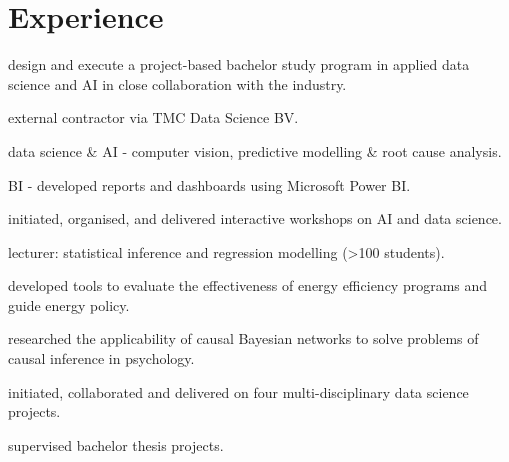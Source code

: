 \begin{minipage}[t]{0.66\textwidth} %

\section{Experience}

\vspace{\topsep}
\begin{tightitemize}
\item design and execute a project-based bachelor study program in applied data science and AI in close collaboration with the industry.
\end{tightitemize}
\sectionspace

\vspace{\topsep}
\begin{tightitemize}
\item external contractor via TMC Data Science BV.
\item data science \& AI - computer vision, predictive modelling \& root cause analysis.
\item BI - developed reports and dashboards using Microsoft Power BI.
\item initiated, organised, and delivered interactive workshops on AI and data science.
\end{tightitemize}
\sectionspace

\vspace{\topsep} %
\begin{tightitemize}
\item lecturer: statistical inference and regression modelling (>100 students).
\item developed tools to evaluate the effectiveness of energy efficiency programs and guide energy policy.
\item researched the applicability of causal Bayesian networks to solve problems of causal inference in psychology.
\item initiated, collaborated and delivered on four multi-disciplinary data science projects.
\item supervised  bachelor thesis projects.
\end{tightitemize}


\end{minipage}
